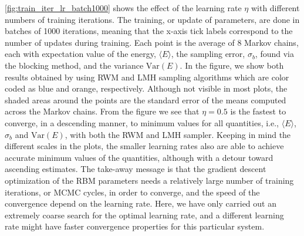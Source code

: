 \autoref{fig:train_iter_lr_batch1000} shows the effect of the learning rate $\eta$ with different numbers of training iterations. The training, or update of parameters, are done in batches of 1000 iterations, meaning that the x-axis tick labels correspond to the number of updates during training. Each point is the average of 8 Markov chains, each with expectation value of the energy, $\langle E \rangle$, the sampling error, $\sigma_b$, found via the blocking method, and the variance $\mathrm{Var}(E)$. In the figure, we show both results obtained by using RWM and LMH sampling algorithms which are color coded as blue and orange, respectively. Although not visible in most plots, the shaded areas around the points are the standard error of the means computed across the Markov chains. From the figure we see that $\eta=0.5$ is the fastest to converge, in a descending manner, to minimum values for all quantities, i.e., $\langle E \rangle$, $\sigma_b$ and $\mathrm{Var}(E)$, with both the RWM and LMH sampler. Keeping in mind the different scales in the plots, the smaller learning rates also are able to achieve accurate minimum values of the quantities, although with a detour toward ascending estimates. The take-away message is that the gradient descent optimization of the RBM parameters needs a relatively large number of training iterations, or MCMC cycles, in order to converge, and the speed of the convergence depend on the learning rate. Here, we have only carried out an extremely coarse search for the optimal learning rate, and a different learning rate might have faster convergence properties for this particular system. 

